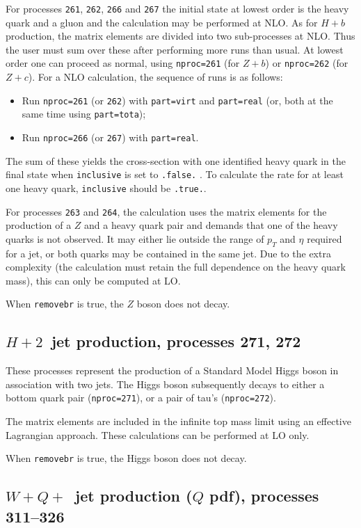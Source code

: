 \documentclass[12pt]{article}
\begin{document}
For processes {\tt 261}, {\tt 262}, {\tt 266} and {\tt 267} the initial
state at lowest order is the heavy quark and a gluon and 
the calculation may be performed at NLO.
As for $H+b$ production, the matrix elements are divided into two
sub-processes at NLO. Thus the user must sum over these after performing
more runs than usual. At lowest order one can proceed as normal, using
{\tt nproc=261} (for $Z+b$) or {\tt nproc=262} (for $Z+c$).
For a NLO calculation, the sequence of runs is as follows:
\begin{itemize}
\item Run {\tt nproc=261} (or {\tt 262}) with {\tt part=virt} and
{\tt part=real} (or, both at the same time using {\tt part=tota});
\item Run {\tt nproc=266} (or {\tt 267}) with {\tt part=real}.
\end{itemize}
The sum of these yields the cross-section with one identified heavy quark in
the final state when {\tt inclusive} is set to {\tt .false.} . To calculate the
rate for at least one heavy quark, {\tt inclusive} should be {\tt .true.}.

For processes {\tt 263} and
{\tt 264}, the calculation uses the matrix elements for the production
of a $Z$ and a heavy quark pair and demands that one of the heavy quarks
is not observed. It may either lie outside the range of $p_T$ and $\eta$
required for a jet, or both quarks may be contained in the same jet.
Due to the extra complexity (the calculation must retain the full
dependence on the heavy quark mass), this can only be computed at LO.

When {\tt removebr} is true, the $Z$ boson does not decay.

\subsection{$H + 2$~jet production, processes 271, 272}

These processes represent the production of a Standard Model Higgs boson
in association with two jets. The Higgs boson
subsequently decays to either a bottom quark pair ({\tt nproc=271}), 
or a pair of tau's ({\tt nproc=272}).

The matrix elements are included in the infinite top mass limit
using an effective Lagrangian approach. These calculations can be
performed at LO only.

When {\tt removebr} is true, the Higgs boson does not decay.

\subsection{$W+Q+$~jet production ($Q$ pdf), processes 311--326}
\label{subsec:wQj}
\end{document}
